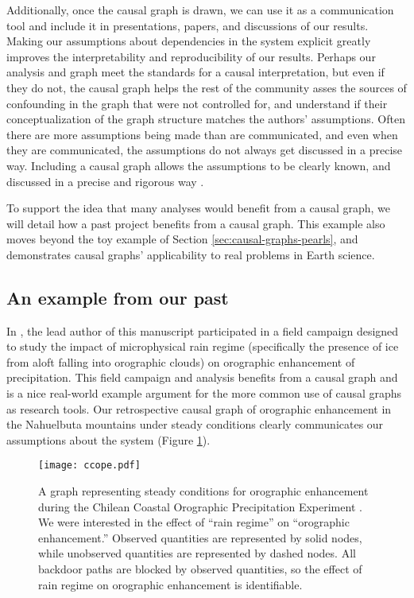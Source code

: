 \documentclass[12pt]{article}
\begin{document}
Additionally, once the causal graph is drawn, we can use it as a
communication tool and include it in presentations, papers, and
discussions of our results. Making our assumptions about dependencies
in the system explicit greatly improves the interpretability and
reproducibility of our results. Perhaps our analysis and graph meet
the standards for a causal interpretation, but even if they do not,
the causal graph helps the rest of the community asses the sources of
confounding in the graph that were not controlled for, and understand
if their conceptualization of the graph structure matches the authors'
assumptions. Often there are more assumptions being made than are
communicated, and even when they are communicated, the assumptions do
not always get discussed in a precise way. Including a causal graph
allows the assumptions to be clearly known, and discussed in a precise
and rigorous way \citep{hannart-da}.

To support the idea that many analyses would benefit from a causal
graph, we will detail how a past project benefits from a causal
graph. This example also moves beyond the toy example of Section
\ref{sec:causal-graphs-pearls}, and demonstrates causal graphs'
applicability to real problems in Earth science.

\subsection{An example from our past}

In \citet{massmann2017}, the lead author of this manuscript
participated in a field campaign designed to study the impact of
microphysical rain regime (specifically the presence of ice from aloft
falling into orographic clouds) on orographic enhancement of
precipitation. This field campaign and analysis benefits from a causal
graph and is a nice real-world example argument for the more common
use of causal graphs as research tools. Our retrospective causal graph
of orographic enhancement in the Nahuelbuta mountains under steady
conditions clearly communicates our assumptions about the system
(Figure \ref{fig:ccope}).

\begin{figure} \texttt{[image: ccope.pdf]}
  \caption{A graph representing steady conditions for orographic
    enhancement during the Chilean Coastal Orographic Precipitation
    Experiment \citep[CCOPE,][]{massmann2017}. We were interested in the
    effect of ``rain regime'' on ``orographic enhancement.''  Observed
    quantities are represented by solid nodes, while unobserved quantities
    are represented by dashed nodes. All backdoor paths are blocked by
    observed quantities, so the effect of rain regime on orographic
    enhancement is identifiable.}
  \label{fig:ccope}
\end{figure}
\end{document}
